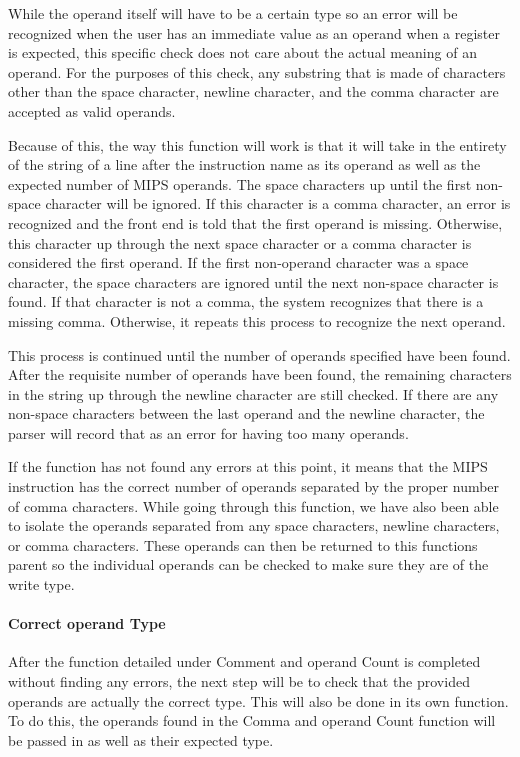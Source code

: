 \documentclass[parskip=half, fontsize=12pt]{scrartcl}
\begin{document}
While the operand itself will have to be a certain type so an error will
be recognized when the user has an immediate value as an operand when a
register is expected, this specific check does not care about the actual
meaning of an operand. For the purposes of this check, any substring
that is made of characters other than the space character, newline
character, and the comma character are accepted as valid operands.

Because of this, the way this function will work is that it will take in
the entirety of the string of a line after the instruction name as its
operand as well as the expected number of MIPS operands. The space
characters up until the first non-space character will be ignored. If
this character is a comma character, an error is recognized and the
front end is told that the first operand is missing. Otherwise, this
character up through the next space character or a comma character is
considered the first operand. If the first non-operand character was a
space character, the space characters are ignored until the next
non-space character is found. If that character is not a comma, the
system recognizes that there is a missing comma. Otherwise, it repeats
this process to recognize the next operand.

This process is continued until the number of operands specified have
been found. After the requisite number of operands have been found, the
remaining characters in the string up through the newline character are
still checked. If there are any non-space characters between the last
operand and the newline character, the parser will record that as an
error for having too many operands.

If the function has not found any errors at this point, it means that
the MIPS instruction has the correct number of operands separated by the
proper number of comma characters. While going through this function, we
have also been able to isolate the operands separated from any space
characters, newline characters, or comma characters. These operands can
then be returned to this function\textquotesingle s parent so the
individual operands can be checked to make sure they are of the write
type.

\paragraph{Correct operand Type}

After the function detailed under Comment and operand Count is completed
without finding any errors, the next step will be to check that the
provided operands are actually the correct type. This will also be done
in its own function. To do this, the operands found in the Comma and
operand Count function will be passed in as well as their expected type.
\end{document}

